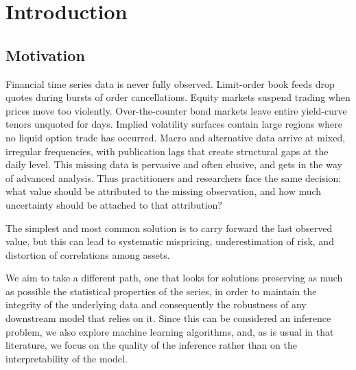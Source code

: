 %
%
%      
%      
%

\chapter{Introduction}
\label{chap:introduction}

\section{Motivation}
\label{sec:motivation}

Financial time series data is never fully observed.
Limit-order book feeds drop quotes during bursts of order cancellations.
Equity markets suspend trading when prices move too violently.
Over-the-counter bond markets leave entire yield-curve tenors unquoted
for days.
Implied volatility surfaces contain large regions where no liquid
option trade has occurred.
Macro and alternative data arrive at mixed, irregular frequencies, with
publication lags that create structural gaps at the daily level.
This missing data is pervasive and often elusive, and gets in the way
of advanced analysis. Thus practitioners and researchers face
the same decision: what value should be attributed to the missing
observation, and how much uncertainty should be attached to that
attribution?

The simplest and most common solution is to carry forward the last observed value,
but this can lead to systematic mispricing, underestimation of risk, and distortion
of correlations among assets.

We aim to take a different path, one that looks for solutions preserving as much
as possible the statistical properties of the series, in order to maintain the integrity of
the underlying data and consequently the robustness of any downstream model that relies on
it. Since this can be considered an inference problem, we also explore machine learning
algorithms, and, as is usual in that literature, we focus on the quality of the inference
rather than on the interpretability of the model.

